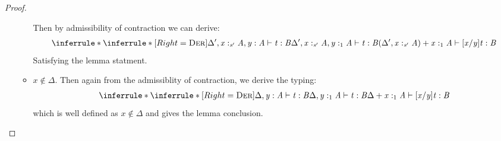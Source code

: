\begin{proof}
\begin{enumerate}
\begin{itemize}
        Then by admissibility of contraction we can derive:
        \begin{align*}
          \inferrule*{
            \inferrule*[Right=\textsc{Der}]
             {\Delta'  \GRANULEsym{,}   \GRANULEmv{x}  :_{\textcolor{coeffectColor}{  \GRANULEnt{s'}  } }   \GRANULEnt{A}   \GRANULEsym{,}   \GRANULEmv{y}  :  \GRANULEnt{A}   \vdash  \GRANULEnt{t}  :  \GRANULEnt{B}}{\Delta'  \GRANULEsym{,}   \GRANULEmv{x}  :_{\textcolor{coeffectColor}{  \GRANULEnt{s'}  } }   \GRANULEnt{A}   \GRANULEsym{,}   \GRANULEmv{y}  :_{\textcolor{coeffectColor}{   1   } }   \GRANULEnt{A}   \vdash  \GRANULEnt{t}  :  \GRANULEnt{B}}
            }
            { \GRANULEsym{(}  \Delta'  \GRANULEsym{,}   \GRANULEmv{x}  :_{\textcolor{coeffectColor}{  \GRANULEnt{s'}  } }   \GRANULEnt{A}   \GRANULEsym{)}  \GRANULEsym{+}   \GRANULEmv{x}  :_{\textcolor{coeffectColor}{   1   } }   \GRANULEnt{A}   \vdash   [  \GRANULEmv{x}  /  \GRANULEmv{y}  ]  \GRANULEnt{t}   :  \GRANULEnt{B} }
        \end{align*}
        Satisfying the lemma statment.

     \item $x \not\in \Delta$. Then
      again from the admissiblity of contraction, we derive the
      typing:
        \begin{align*}
          \inferrule*{
            \inferrule*[Right=\textsc{Der}]
             {\Delta  \GRANULEsym{,}   \GRANULEmv{y}  :  \GRANULEnt{A}   \vdash  \GRANULEnt{t}  :  \GRANULEnt{B}}{\Delta  \GRANULEsym{,}   \GRANULEmv{y}  :_{\textcolor{coeffectColor}{   1   } }   \GRANULEnt{A}   \vdash  \GRANULEnt{t}  :  \GRANULEnt{B}}
            }
            { \Delta  \GRANULEsym{+}   \GRANULEmv{x}  :_{\textcolor{coeffectColor}{   1   } }   \GRANULEnt{A}   \vdash   [  \GRANULEmv{x}  /  \GRANULEmv{y}  ]  \GRANULEnt{t}   :  \GRANULEnt{B} }
        \end{align*}
        which is well defined as $x \not\in \Delta$ and gives the
        lemma conclusion.
        \end{itemize}


\end{enumerate}
\end{proof}
